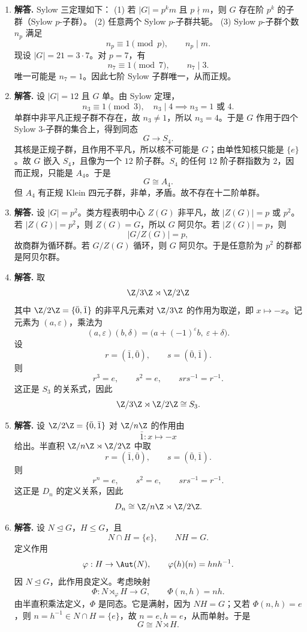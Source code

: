 \begin{enumerate}[label=\textbf{\arabic*.}, leftmargin=*, itemsep=1em]
\item \textbf{解答.} Sylow 三定理如下：  
(1) 若 $|G|=p^k m$ 且 $p\nmid m$，则 $G$ 存在阶 $p^k$ 的子群（Sylow $p$-子群）。  
(2) 任意两个 Sylow $p$-子群共轭。  
(3) Sylow $p$-子群个数 $n_p$ 满足
\[
n_p\equiv1\pmod p,\qquad n_p\mid m.
\]
现设 $|G|=21=3\cdot7$。对 $p=7$，有
\[
n_7\equiv1\pmod7,\qquad n_7\mid3.
\]
唯一可能是 $n_7=1$。因此七阶 Sylow 子群唯一，从而正规。

\item \textbf{解答.} 设 $|G|=12$ 且 $G$ 单。由 Sylow 定理，
\[
n_3\equiv1\pmod3,\quad n_3\mid4 \implies n_3=1\text{ 或 }4.
\]
单群中非平凡正规子群不存在，故 $n_3\neq1$，所以 $n_3=4$。于是 $G$ 作用于四个 Sylow $3$-子群的集合上，得到同态
\[
G\to S_4.
\]
其核是正规子群，且作用不平凡，所以核不可能是 $G$；由单性知核只能是 $\{e\}$。故 $G$ 嵌入 $S_4$，且像为一个 $12$ 阶子群。$S_4$ 的任何 $12$ 阶子群指数为 $2$，因而正规，只能是 $A_4$。于是
\[
G\cong A_4.
\]
但 $A_4$ 有正规 Klein 四元子群，非单，矛盾。故不存在十二阶单群。

\item \textbf{解答.} 设 $|G|=p^2$。类方程表明中心 $Z(G)$ 非平凡，故 $|Z(G)|=p$ 或 $p^2$。若 $|Z(G)|=p^2$，则 $Z(G)=G$，所以 $G$ 阿贝尔。若 $|Z(G)|=p$，则
\[
|G/Z(G)|=p,
\]
故商群为循环群。若 $G/Z(G)$ 循环，则 $G$ 阿贝尔。于是任意阶为 $p^2$ 的群都是阿贝尔群。

\item \textbf{解答.} 取
\[
\Z/3\Z\rtimes \Z/2\Z
\]
其中 $\Z/2\Z=\{\bar0,\bar1\}$ 的非平凡元素对 $\Z/3\Z$ 的作用为取逆，即 $x\mapsto -x$。记元素为 $(a,\varepsilon)$，乘法为
\[
(a,\varepsilon)(b,\delta)=\bigl(a+(-1)^\varepsilon b,\ \varepsilon+\delta\bigr).
\]
设
\[
r=(\bar1,\bar0),\qquad s=(\bar0,\bar1).
\]
则
\[
r^3=e,\qquad s^2=e,\qquad srs^{-1}=r^{-1}.
\]
这正是 $S_3$ 的关系式，因此
\[
\Z/3\Z\rtimes \Z/2\Z\cong S_3.
\]

\item \textbf{解答.} 设 $\Z/2\Z=\{\bar0,\bar1\}$ 对 $\Z/n\Z$ 的作用由
\[
\bar1:x\mapsto -x
\]
给出。半直积 $\Z/n\Z\rtimes \Z/2\Z$ 中取
\[
r=(\bar1,\bar0),\qquad s=(\bar0,\bar1).
\]
则
\[
r^n=e,\qquad s^2=e,\qquad srs^{-1}=r^{-1}.
\]
这正是 $D_n$ 的定义关系，因此
\[
D_n\cong \Z/n\Z\rtimes \Z/2\Z.
\]

\item \textbf{解答.} 设 $N\trianglelefteq G$，$H\le G$，且
\[
N\cap H=\{e\},\qquad NH=G.
\]
定义作用
\[
\varphi:H\to \Aut(N),\qquad \varphi(h)(n)=hnh^{-1}.
\]
因 $N\trianglelefteq G$，此作用良定义。考虑映射
\[
\Phi:N\rtimes_\varphi H\to G,\qquad \Phi(n,h)=nh.
\]
由半直积乘法定义，$\Phi$ 是同态。它是满射，因为 $NH=G$；又若 $\Phi(n,h)=e$，则 $n=h^{-1}\in N\cap H=\{e\}$，故 $n=e,h=e$，从而单射。于是
\[
G\cong N\rtimes H.
\]


\end{enumerate}
